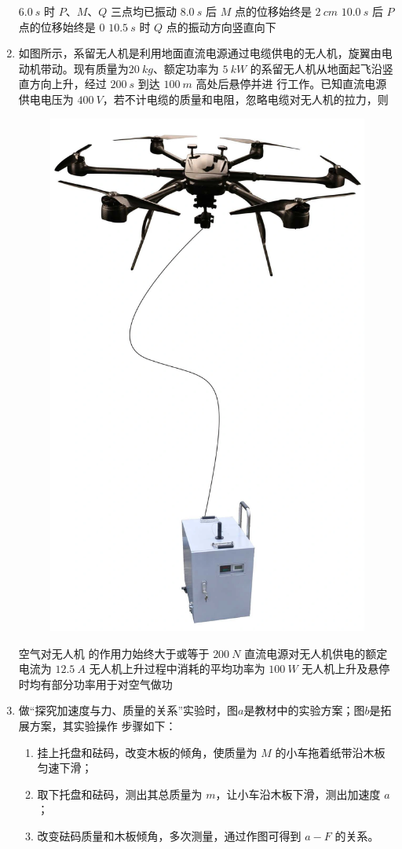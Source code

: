 \begin{enumerate}
\fourchoices
{$ 6.0 \ s $ 时 $ P $、$ M $、$ Q $ 三点均已振动}
{$ 8.0 \ s $ 后 $ M $ 点的位移始终是 $ 2 \ cm $}
{$ 10.0 \ s $ 后 $ P $ 点的位移始终是 $ 0 $}
{$ 10.5 \ s $ 时 $ Q $ 点的振动方向竖直向下}



\item
如图所示，系留无人机是利用地面直流电源通过电缆供电的无人机，旋翼由电动机带动。现有质量为$ 20 \ kg $、额定功率为 $ 5 \ kW $ 的系留无人机从地面起飞沿竖直方向上升，经过 $ 200 \ s $ 到达 $ 100 \ m $ 高处后悬停并进
行工作。已知直流电源供电电压为 $ 400 \ V $，若不计电缆的质量和电阻，忽略电缆对无人机的拉力，则  
\begin{figure}[h!]
\centering
\includegraphics[width=0.15\linewidth]{picture/screenshot049}
\end{figure}

\fourchoices
{空气对无人机 的作用力始终大于或等于 $ 200 \ N $}
{直流电源对无人机供电的额定电流为 $ 12.5 \ A $}
{无人机上升过程中消耗的平均功率为 $ 100 \ W $}
{无人机上升及悬停时均有部分功率用于对空气做功}






\item
做“探究加速度与力、质量的关系”实验时，图$ a $是教材中的实验方案；图$ b $是拓展方案，其实验操作
步骤如下：
\begin{figure}[h!]
\centering
\begin{subfigure}{0.44\linewidth}
\centering
 
\caption{}\label{}
\end{subfigure}
\begin{subfigure}{0.44\linewidth}
\centering
 
\caption{}\label{}
\end{subfigure}
\end{figure}
\begin{enumerate}
\renewcommand{\labelenumii}{\roman{enumii}.}
\item
挂上托盘和砝码，改变木板的倾角，使质量为 $ M $ 的小车拖着纸带沿木板匀速下滑；
\item 
取下托盘和砝码，测出其总质量为 $ m $，让小车沿木板下滑，测出加速度 $ a $；
\item 
改变砝码质量和木板倾角，多次测量，通过作图可得到 $ a-F $ 的关系。



\end{enumerate}
\end{enumerate}
